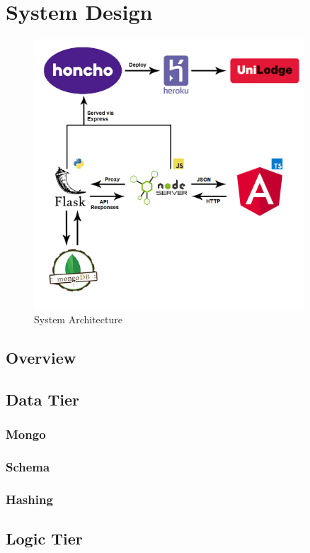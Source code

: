 \chapter{System Design}
\begin{figure}[H]
	\caption{System Architecture}
	\label{image:myImageName}
	\centering
	\includegraphics[width=0.9\textwidth]{images/design.png}
\end{figure}	

\section{Overview}

\section{Data Tier}
\subsection{Mongo}
\subsection{Schema}
\subsection{Hashing}

\section{Logic Tier}
